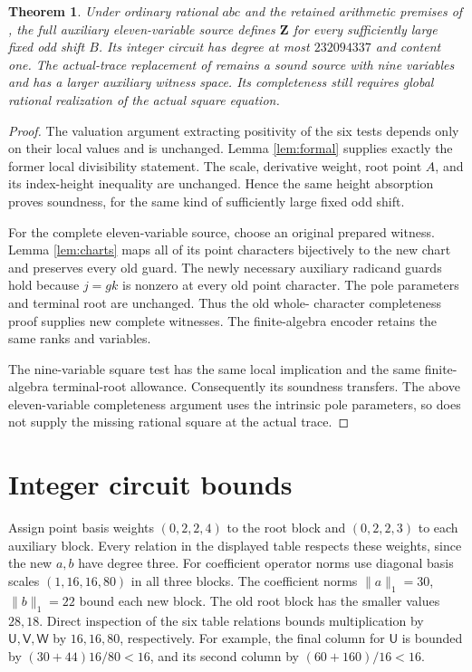 \documentclass[11pt,a4paper]{article}
\newcommand{\Z}{\mathbf Z}
\newtheorem{theorem}{Theorem}
\begin{document}
\begin{theorem}\label{thm:transfer}
Under ordinary rational $abc$ and the retained arithmetic premises
of \cite{Derivative}, the full auxiliary eleven-variable source
defines $\Z$ for every sufficiently large fixed odd shift $B$.
Its integer circuit has degree at most $232094337$ and content
one. The actual-trace replacement of \cite{Criterion} remains a
sound source with nine variables and has a larger auxiliary
witness space. Its completeness still requires global rational
realization of the actual square equation.
\end{theorem}
\begin{proof}
The valuation argument extracting positivity of the six tests
depends only on their local values and is unchanged. Lemma
\ref{lem:formal} supplies exactly the former local divisibility
statement. The scale, derivative weight, root point $A$, and its
index-height inequality are unchanged. Hence the same height
absorption proves soundness, for the same kind of sufficiently
large fixed odd shift.

For the complete eleven-variable source, choose an original
prepared witness. Lemma \ref{lem:charts} maps all of its point
characters bijectively to the new chart and preserves every
old guard. The newly necessary auxiliary radicand guards hold
because $j=gk$ is nonzero at every old point character. The pole
parameters and terminal root are unchanged. Thus the old whole-
character completeness proof supplies new complete witnesses.
The finite-algebra encoder retains the same ranks and variables.

The nine-variable square test has the same local implication
and the same finite-algebra terminal-root allowance. Consequently
its soundness transfers. The above eleven-variable completeness
argument uses the intrinsic pole parameters, so does not supply
the missing rational square at the actual trace.
\end{proof}

\section{Integer circuit bounds}
Assign point basis weights $(0,2,2,4)$ to the root block and
$(0,2,2,3)$ to each auxiliary block. Every relation in the displayed
table respects these weights, since the new $a,b$ have degree three.
For coefficient operator norms use diagonal basis scales
$(1,16,16,80)$ in all three blocks. The coefficient norms
$\|a\|_1=30$, $\|b\|_1=22$ bound each new block. The old root
block has the smaller values $28,18$. Direct inspection of the
six table relations bounds multiplication by
$\mathsf U,\mathsf V,\mathsf W$ by $16,16,80$, respectively.
For example, the final column for $\mathsf U$ is bounded by
$(30+44)16/80<16$, and its second column by
$(60+160)/16<16$.
\end{document}
